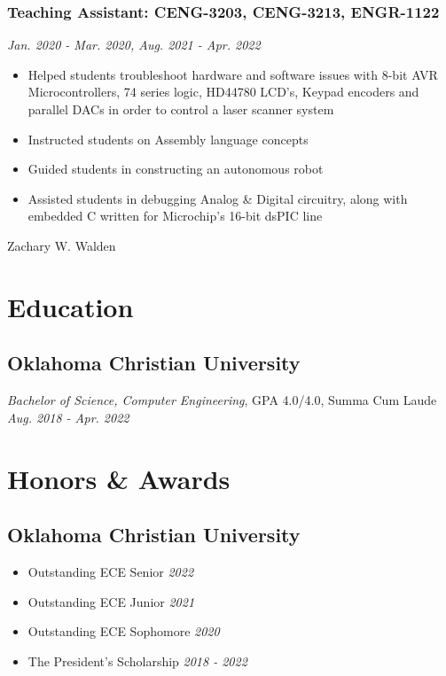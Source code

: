 \documentclass{article}
\begin{document}
\begin{spacing}{.5}
		\subsubsection{\large{Teaching Assistant: CENG-3203, CENG-3213, ENGR-1122}} \hfill \small{\textsl{Jan. 2020 - Mar. 2020, Aug. 2021 - Apr. 2022}}
			\begin{itemize}[label=--,itemsep=-.35ex]
				\item \large{Helped students troubleshoot hardware and software issues with 8-bit AVR Microcontrollers, 74 series logic, HD44780 LCD's, Keypad encoders and parallel DACs in order to control a laser scanner system}
				\item \large{Instructed students on Assembly language concepts}
				\item \large{Guided students in constructing an autonomous robot}
				\item \large{Assisted students in debugging Analog \& Digital circuitry, along with embedded C written for Microchip's 16-bit dsPIC line}
			\end{itemize}
\newpage

\begin{center}
	\begin{huge}
		Zachary W. Walden\\
	\end{huge}
\end{center}

\section{Education}
	\subsection{Oklahoma Christian University}
		\hspace*{.35cm} \textit{Bachelor of Science, Computer Engineering}, GPA 4.0/4.0, Summa Cum Laude \hfill \small{\textsl{Aug. 2018 - Apr. 2022}}

\section{Honors \& Awards}
	\subsection{Oklahoma Christian University}
		\begin{itemize}[label=$\bullet$,itemsep=-.35ex]
			\item \large{Outstanding ECE Senior} \hfill \small{\textsl{2022}}
			\item \large{Outstanding ECE Junior} \hfill \small{\textsl{2021}}
			\item \large{Outstanding ECE Sophomore} \hfill \small{\textsl{2020}}
			\item \large{The President's Scholarship} \hfill \small{\textsl{2018 - 2022}}
		\end{itemize}


\end{spacing}
\end{document}
